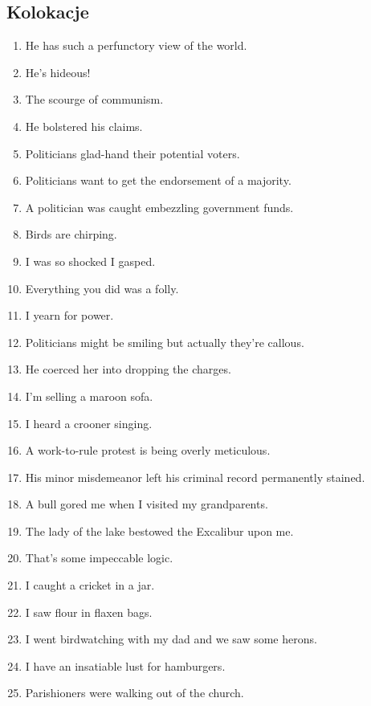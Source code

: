 \documentclass{article}
\begin{document}
\subsection{Kolokacje}
\begin{enumerate}
    \item He has such a perfunctory view of the world.
    \item He's hideous!
    \item The scourge of communism.
    \item He bolstered his claims.
    \item Politicians glad-hand their potential voters.
    \item Politicians want to get the endorsement of a majority.
    \item A politician was caught embezzling government funds.
    \item Birds are chirping.
    \item I was so shocked I gasped.
    \item Everything you did was a folly.
    \item I yearn for power.
    \item Politicians might be smiling but actually they're callous.
    \item He coerced her into dropping the charges.
    \item I'm selling a maroon sofa.
    \item I heard a crooner singing.
    \item A work-to-rule protest is being overly meticulous.
    \item His minor misdemeanor left his criminal record permanently stained.
    \item A bull gored me when I visited my grandparents.
    \item The lady of the lake bestowed the Excalibur upon me.
    \item That's some impeccable logic.
    \item I caught a cricket in a jar.
    \item I saw flour in flaxen bags.
    \item I went birdwatching with my dad and we saw some herons.
    \item I have an insatiable lust for hamburgers.
    \item Parishioners were walking out of the church.
\end{enumerate}
\end{document}
